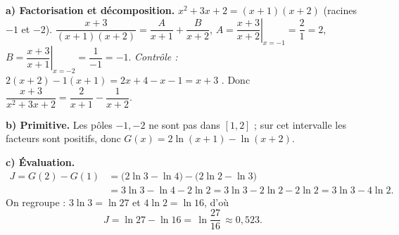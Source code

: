 \documentclass[11pt,a4paper]{article}
\begin{document}
\begin{corr}[4]
\textbf{a) Factorisation et décomposition.} $x^2+3x+2=(x+1)(x+2)$ (racines $-1$ et $-2$).
$\dfrac{x+3}{(x+1)(x+2)}=\dfrac{A}{x+1}+\dfrac{B}{x+2}$,
$A=\left.\dfrac{x+3}{x+2}\right|_{x=-1}=\dfrac{2}{1}=2$,
$B=\left.\dfrac{x+3}{x+1}\right|_{x=-2}=\dfrac{1}{-1}=-1$.
\emph{Contrôle :} $2(x+2)-1(x+1)=2x+4-x-1=x+3$ \checkmark. Donc
$\dfrac{x+3}{x^2+3x+2}=\dfrac{2}{x+1}-\dfrac{1}{x+2}$.

\smallskip
\textbf{b) Primitive.} Les pôles $-1,-2$ ne sont pas dans $[1,2]$ ; sur cet intervalle les facteurs
sont positifs, donc $G(x)=2\ln(x+1)-\ln(x+2)$.

\smallskip
\textbf{c) Évaluation.}
\begin{align*}
J=G(2)-G(1)&=\bigl(2\ln3-\ln4\bigr)-\bigl(2\ln2-\ln3\bigr)\\
&=3\ln3-\ln4-2\ln2
=3\ln3-2\ln2-2\ln2=3\ln3-4\ln2.
\end{align*}
On regroupe : $3\ln3=\ln27$ et $4\ln2=\ln16$, d'où
\[
J=\ln27-\ln16=\boxed{\,\ln\frac{27}{16}\,}\approx 0{,}523.
\]
\end{corr}
\end{document}
